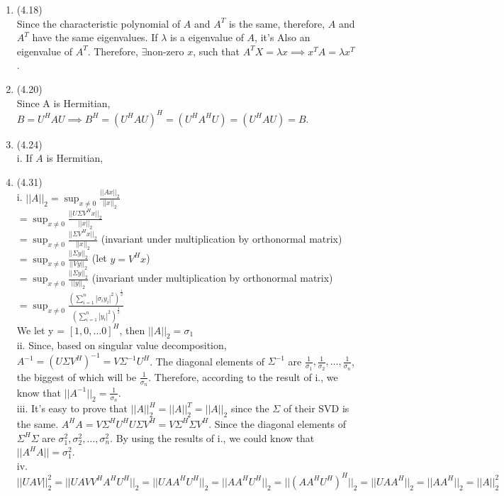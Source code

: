 \documentclass[letterpaper,12pt]{article}
\theoremstyle{definition}
\begin{document}
\begin{enumerate}
	\item(4.18)\\
	Since the characteristic polynomial of $A$ and $A^{T}$ is the same, therefore, $A$ and $A^{T}$ have the same eigenvalues. If $\lambda$ is a eigenvalue of $A$, it's Also an eigenvalue of $A^{T}$. Therefore, $\exists $non-zero $x$, such that $A^{T}X = \lambda x \implies x^{T}A =\lambda x^{T}$.\\

	\item(4.20)\\
	Since A is Hermitian, $B = U^{H}AU \implies B^{H} = ( U^{H}AU)^{H} = (U^{H}A^{H}U) = (U^{H}AU) = B$.\\
	
	\item(4.24)\\
	i. If $A$ is Hermitian, \\

	\item(4.31)\\
	i. $||A||_{2} = \sup_{x \neq 0} \frac{||Ax||_{2}}{||x||_{2}}$\\
	   $=  \sup_{x \neq 0} \frac{||U\Sigma V^{H}x||_{2}}{||x||_{2}}$\\
	   $= \sup_{x \neq 0} \frac{||\Sigma V^{H}x||_{2}}{||x||_{2}}$ (invariant under multiplication by orthonormal matrix)\\
	   $= \sup_{x \neq 0} \frac{||\Sigma y||_{2}}{||Vy||_{2}}$ (let $y  = V^{H}x$)\\
	   $= \sup_{x \neq 0} \frac{||\Sigma y||_{2}}{||y||_{2}}$  (invariant under multiplication by orthonormal matrix)\\
	   $= \sup_{x \neq 0} \frac{(\sum_{i = 1}^{n} |\sigma_{i}y_{i}|^{2})^{\frac{1}{2}}}{(\sum_{i = 1}^{n} |y_{i}|^{2})^{\frac{1}{2}}}$\\
	   We let y =  $[1, 0, \hdots 0]^{H}$, then $||A||_{2} = \sigma_{1}$\\
	ii. Since, based on singular value decomposition, $A^{-1} = (U\Sigma V^{H})^{-1} = V \Sigma^{-1} U^{H}$. The diagonal elements of $\Sigma^{-1}$ are $\frac{1}{\sigma_{1}}, \frac{1}{\sigma_{2}}, \hdots, \frac{1}{\sigma_{n}}$, the biggest of which will be $\frac{1}{\sigma_{n}}$. Therefore, according to the result of i., we know that $||A^{-1}||_{2} = \frac{1}{\sigma_{n}}$.\\
	iii. It's easy to prove that $||A||_{2}^{H} = ||A||_{2}^{T} = ||A||_{2}$ since the $\Sigma$ of their SVD is the same. $A^{H}A = V\Sigma^{H}U^{H}U\Sigma V^{H} = V \Sigma^{H}\Sigma V^{H}$. Since the diagonal elements of $ \Sigma^{H}\Sigma$ are $\sigma_{1}^{2}, \sigma_{2}^{2}, \hdots, \sigma_{n}^{2}$. By using the results of i., we could know that $||A^{H}A|| = \sigma_{1}^{2}$.\\
	iv. $||UAV||_{2}^{2} = ||UAVV^{H}A^{H}U^{H}||_{2} = ||UAA^{H}U^{H}||_{2} = ||AA^{H}U^{H}||_{2} = ||(AA^{H}U^{H})^{H}||_{2} = ||UAA^{H}||_{2} = ||AA^{H}||_{2} = ||A||_{2}^{2}$\\


\end{enumerate}
\end{document}

